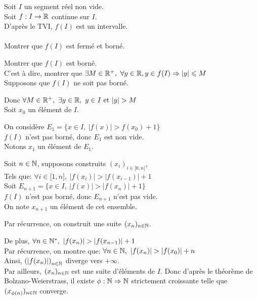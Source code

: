\documentclass[12pt,twoside,a4paper]{article}
\begin{document}
		\begin{preuve}
			Soit $I$ un segment réel non vide.\\
			Soit $f:I\rightarrow \mathbb{R}$ continue sur $I$.\\
			D'apr\`es le TVI, $f(I)$ est un intervalle.\\
			\\
			Montrer que $f(I)$ est fermé et borné.
			\begin{liste}
				\item Montrer que $f(I)$ est borné.\\
					C'est \`a dire, montrer que $\exists M\in\mathbb{R}^{+},\ \forall y\in\mathbb{R}, y\in f(I)\Rightarrow |y|\leqslant M$\\
					 Supposons que $f(I)$ ne soit pas borné.
					\begin{tab}
						Donc $\forall M\in\R^{+},\ \exists y\in\R,\ y\in I\et |y|> M$\\
						Soit $x_0$ un élément de $I$.
						\begin{liste}
							\item On considère $E_1=\{x\in I,\ |f(x)|>f(x_0)+1 \}$\\
								$f(I)$ n'est pas borné, donc $E_1$ est non vide.\\
								Notons $x_1$ un élément de $E_1$.
							\item Soit $n\in\mathbb{N}$, supposons construits $(x_i)_{i\in\lbrack0,n\rbrack}$,\\
								Tels que: $\forall i\in\lbrack1,n\rbrack,\ |f(x_i)|>|f(x_{i-1})|+1$\\
								Soit $E_{n+1}=\{x\in I,\ |f(x)|>|f(x_n)|+1 \}$\\
								$f(I)$ n'est pas borné, donc $E_{n+1}$ n'est pas vide.\\
								On note $x_{n+1}$ un élément de cet ensemble.
							\item Par récurrence, on construit une suite $(x_n)_{n\in \mathbb{N}}$.
						\end{liste}
						De plus, $\forall n\in\N^{*},\ |f(x_n)|>|f(x_{n-1})|+1$\\
						Par récurrence, on montre que: $\forall n\in\N,\ |f(x_n)|>|f(x_0)|+n$\\
						Ainsi, $\left( |f(x_n)|\right) _{n\in\mathbb{N}}$ diverge vers $+\infty$.\\
						\newpage
						Par ailleurs, $(x_n)_{n\in\mathbb{N}}$ est une suite d'éléments de $I$. Donc d'après le théorème de Bolzano-Weierstrass, il existe $\phi:\mathbb{N}\Rightarrow\mathbb{N}$ strictement croissante telle que $(x_{\phi(n)})_{n\in\mathbb{N}}$ converge.\\

\end{tab}
\end{liste}
\end{preuve}
\end{document}
